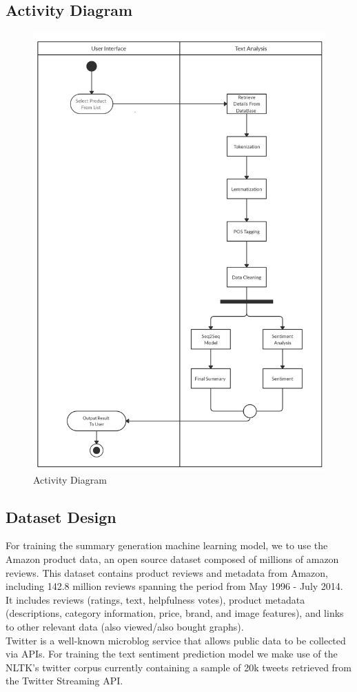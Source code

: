 \documentclass[11pt]{report}
\begin{document}
\clearpage
\subsection{Activity Diagram}
\begin{figure}[hbt!]
\centering
\includegraphics[scale=0.25]{images/ActDiagram.png}
\caption{Activity Diagram}
\label{fig:activitydiagram}
\end{figure}

\pagebreak
\subsection{Dataset Design}
For training the summary generation machine learning model, we to use the Amazon product data\cite{20}, an open source dataset composed of millions of amazon reviews. This dataset contains product reviews and metadata from Amazon, including 142.8 million reviews spanning the period from May 1996 - July 2014. It includes reviews (ratings, text, helpfulness votes), product metadata (descriptions, category information, price, brand, and image features), and links to other relevant data (also viewed/also bought graphs). \\
Twitter is a well-known microblog service that allows public data to be collected via APIs. For training the text sentiment prediction model we make use of the NLTK's twitter corpus currently containing a sample of 20k tweets retrieved from the Twitter Streaming API. 
\end{document}
